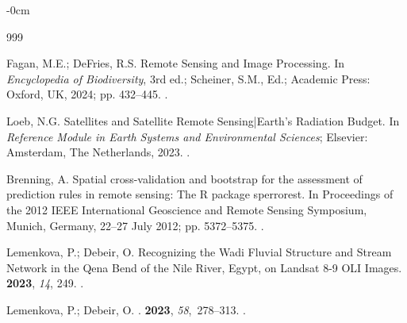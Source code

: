 \documentclass[coasts,article,accept,pdftex,oneauthor]{Definitions/mdpi}
\begin{document}
\begin{adjustwidth}{-\extralength}{0cm}


%


\begin{thebibliography}{999}

Fagan, M.E.; DeFries, R.S.
\newblock Remote Sensing and Image Processing. In {\em Encyclopedia of
  Biodiversity}, 3rd  ed.;  Scheiner, S.M., Ed.;
  Academic Press: Oxford, UK, 2024; pp. 432--445.
.

Loeb, N.G.
\newblock Satellites and Satellite Remote Sensing|Earth's Radiation Budget.
  In {\em Reference Module in Earth Systems and Environmental Sciences};
  Elsevier: Amsterdam, The Netherlands, %
  2023.
.

Brenning, A.
\newblock Spatial cross-validation and bootstrap for the assessment of
  prediction rules in remote sensing: The R package sperrorest.
\newblock In Proceedings of the 2012 IEEE International Geoscience and Remote
  Sensing Symposium, Munich, Germany, 22--27 July 2012; pp. 5372--5375. %
.

Lemenkova, P.; Debeir, O.
\newblock Recognizing the Wadi Fluvial Structure and Stream Network in the Qena
  Bend of the Nile River, Egypt, on Landsat 8-9 OLI Images.
 {\bf 2023}, {\em 14}, 249.
.

Lemenkova, P.; Debeir, O.
.
 {\bf 2023}, {\em 58},~278--313.
.


\end{thebibliography}
\end{adjustwidth}
\end{document}
